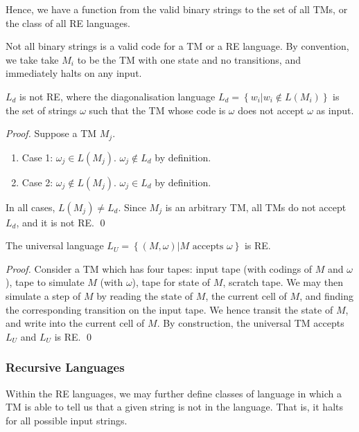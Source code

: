 Hence, we have a function from the valid binary strings to the set of all TMs,
or the class of all RE languages.
\begin{remark}
  Not all binary strings is a valid code for a TM or a RE language. By
  convention, we take take $M_i$ to be the TM with one state and no
  transitions, and immediately halts on any input.
\end{remark}

\begin{example}
  $L_d$ is not RE, where the diagonalisation language $L_d=\left\{ w_i |
  w_i\not\in L(M_i)  \right\} $ is the set of strings $\omega$ such that the TM
  whose code is $\omega$ does not accept $\omega$ as input.
\end{example}
\begin{proof}
  Suppose a TM $M_j$.
  \begin{enumerate}
    \item Case 1: $\omega_j\in L(M_j)$. $\omega_j\not\in L_d$ by definition.
    \item Case 2: $\omega_j\not\in L(M_j)$. $\omega_j\in L_d$ by definition.
  \end{enumerate}
  In all cases, $L(M_j)\neq L_d$. Since $M_j$ is an arbitrary TM, all TMs do
  not accept $L_d$, and it is not RE. \qed
\end{proof}

\begin{example}
  The universal language $L_U=\left\{ \left( M,\omega \right) | M\text{ accepts
  }\omega \right\}$ is RE.
\end{example}
\begin{proof}
  Consider a TM which has four tapes: input tape (with codings of $M$ and
  $\omega$), tape to simulate $M$ (with $\omega$), tape for state of $M$,
  scratch tape. We may then simulate a step of $M$ by reading the state of $M$,
  the current cell of $M$, and finding the corresponding transition on the
  input tape. We hence transit the state of $M$, and write into the current
  cell of $M$. By construction, the universal TM accepts $L_U$ and $L_U$ is RE.
  \qed
\end{proof}

\subsubsection{Recursive Languages}
Within the RE languages, we may further define classes of language in which a
TM is able to tell us that a given string is not in the language. That is, it
halts for all possible input strings.

